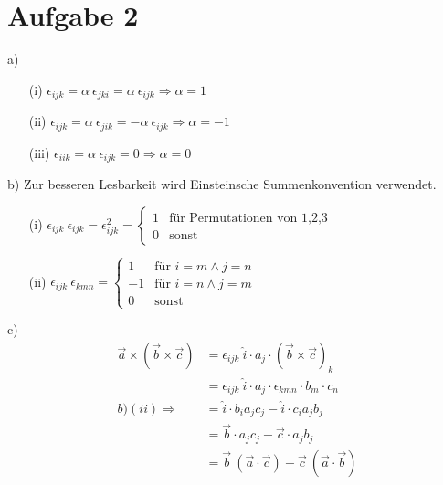 \documentclass[11pt a4paper]{article}
\begin{document}
\section*{Aufgabe 2}
a)
\begin{enumerate}
	\item[(i)] 
		$ \epsilon_{ijk} 
		= \alpha \ \epsilon_{jki} 
		= \alpha \ \epsilon_{ijk}
		\Rightarrow \alpha = 1$
	\item[(ii)]
		$ \epsilon_{ijk} 
		= \alpha \ \epsilon_{jik} 
		= -\alpha \ \epsilon_{ijk}
		\Rightarrow \alpha = -1$
	\item[(iii)]
		$ \epsilon_{iik} 
		= \alpha \ \epsilon_{ijk} 
		= 0
		\Rightarrow \alpha = 0$
\end{enumerate}
\vspace{0.5cm}
b) Zur besseren Lesbarkeit wird Einsteinsche Summenkonvention verwendet.
\begin{enumerate}
	\item[(i)]
		$ \epsilon_{ijk} \ \epsilon_{ijk} = \epsilon_{ijk}^2
		= \begin{cases} 
			1 & \text{für Permutationen von 1,2,3} \\
			0 & \text{sonst}
		\end{cases} $
	\item[(ii)]
		$ \epsilon_{ijk} \ \epsilon_{kmn} =
		\begin{cases}
			1 & \text{für }  i=m \wedge j=n \\
			-1 & \text{für } i=n \wedge j=m \\
			0 & \text{sonst} 
		\end{cases} $
\end{enumerate}
\vspace{0.5cm}
c)
\begin{align*}
	\vec a \times (\vec b \times \vec c)
	&= \epsilon_{ijk} \ \hat i \cdot a_j \cdot (\vec b \times \vec c)_k
	\\
	&= \epsilon_{ijk} \ \hat i \cdot a_j \cdot 
	\epsilon_{kmn} \cdot b_m \cdot c_n
	\\
	b)(ii) \Rightarrow
	&= \hat i \cdot b_i a_j c_j - \hat i \cdot c_i a_j b_j
	\\
	&= \vec b \cdot a_j c_j - \vec c \cdot  a_j b_j
	\\
	&= \vec b \ (\vec a \cdot \vec c) - \vec c \ (\vec a \cdot \vec b)
	\\
\end{align*}
\end{document}
